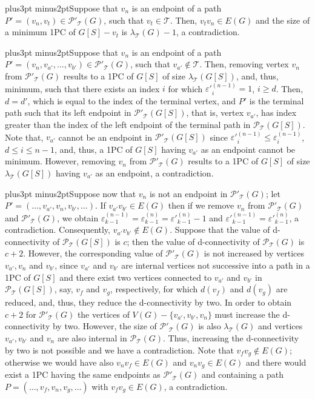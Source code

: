 \documentclass[10pt]{article}
\def\yskip{\penalty-50\vskip3pt plus3pt minus2pt}
\def\y{\yskip}
\begin{document}
{\y Suppose that $v_n$ is an endpoint of a path $P'=(v_n, v_t) \in
\mathcal{P'_{\mathcal{T}}}(G)$, such that $v_t \in \mathcal{T}$.
Then, $v_tv_n \in E(G)$ and the size of a minimum 1PC of
$G[S]-v_t$ is $\lambda_\mathcal{T}(G)-1$, a contradiction.

\y Suppose that $v_n$ is an endpoint of a path $P'=(v_n, v_{a'},
\ldots, v_{b'}) \in \mathcal{P'_{\mathcal{T}}}(G)$, such that
$v_{a'} \notin \mathcal{T}$. Then, removing vertex $v_n$ from
$\mathcal{P'_{\mathcal{T}}}(G)$ results to a 1PC of $G[S]$ of size
$\lambda_\mathcal{T}(G[S])$, and, thus, minimum, such that there
exists an index $i$ for which $\varepsilon'^{(n-1)}_i=1$, $i \geq
d$. Then, $d=d'$, which is equal to the index of the terminal
vertex, and $P'$ is the terminal path such that its left endpoint
in $\mathcal{P'_{\mathcal{T}}}(G[S])$, that is, vertex $v_{a'}$,
has index greater than the index of the left endpoint of the
terminal path in $\mathcal{P_{\mathcal{T}}}(G[S])$. Note that,
$v_{a'}$ cannot be an endpoint in
$\mathcal{P'_{\mathcal{T}}}(G[S])$ since $\varepsilon'^{(n-1)}_i
\leq \varepsilon^{(n-1)}_i$, $d \leq i \leq n-1$, and, thus, a 1PC
of $G[S]$ having $v_{a'}$ as an endpoint cannot be minimum.
However, removing $v_n$ from $\mathcal{P'_{\mathcal{T}}}(G)$
results to a 1PC of $G[S]$ of size $\lambda_\mathcal{T}(G[S])$
having $v_{a'}$ as an endpoint, a contradiction.

\y Suppose now that $v_n$ is not an endpoint in
$\mathcal{P'_{\mathcal{T}}}(G)$; let $P'=(\ldots, v_{a'}, v_n,
v_{b'}, \ldots)$. If $v_{a'}v_{b'} \in E(G)$ then if we remove
$v_n$ from $\mathcal{P'_{\mathcal{T}}}(G)$ and
$\mathcal{P'_{\mathcal{T}}}(G)$, we obtain
$\varepsilon^{(n-1)}_{k-1}=\varepsilon^{(n)}_{k-1}=\varepsilon'^{(n)}_{k-1}-1$
and $\varepsilon'^{(n-1)}_{k-1}=\varepsilon'^{(n)}_{k-1}$, a
contradiction. Consequently, $v_{a'}v_{b'} \notin E(G)$. Suppose
that the value of d-connectivity of
$\mathcal{P_{\mathcal{T}}}(G[S])$ is $c$; then the value of
d-connectivity of $\mathcal{P_{\mathcal{T}}}(G)$ is $c+2$.
However, the corresponding value of
$\mathcal{P'_{\mathcal{T}}}(G)$ is not increased by vertices
$v_{a'}, v_n$ and $v_{b'}$, since $v_{a'}$ and $v_{b'}$ are
internal vertices not successive into a path in a 1PC of $G[S]$
and there exist two vertices connected to $v_{a'}$ and $v_{b'}$ in
$\mathcal{P_{\mathcal{T}}}(G[S])$, say, $v_f$ and $v_g$,
respectively, for which $d(v_f)$ and $d(v_g)$ are reduced, and,
thus, they reduce the d-connectivity by two. In order to obtain
$c+2$ for $\mathcal{P'_{\mathcal{T}}}(G)$ the vertices of
$V(G)-\{v_{a'}, v_{b'}, v_n\}$ must increase the d-connectivity by
two. However, the size of $\mathcal{P'_{\mathcal{T}}}(G)$ is also
$\lambda_\mathcal{T}(G)$ and vertices $v_{a'}, v_{b'}$ and $v_n$
are also internal in $\mathcal{P_{\mathcal{T}}}(G)$. Thus,
increasing the d-connectivity by two is not possible and we have a
contradiction. Note that $v_fv_g \notin E(G)$; otherwise we would
have also $v_nv_f \in E(G)$ and $v_nv_g \in E(G)$ and there would
exist a 1PC having the same endpoints as
$\mathcal{P'_{\mathcal{T}}}(G)$ and containing a path $P=(\ldots,
v_f, v_n, v_g, \ldots)$ with $v_fv_g \in E(G)$, a contradiction.

}
\end{document}

